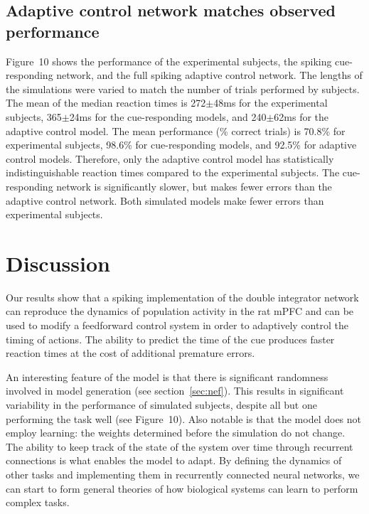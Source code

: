 \documentclass[11pt]{article}
\begin{document}
\subsection{Adaptive control network matches observed performance}

Figure~10 shows the performance
of the experimental subjects,
the spiking cue-responding network,
and the full spiking adaptive control network.
The lengths of the simulations were
varied to match the number of trials
performed by subjects.
The mean of the median reaction times
is 272$\pm$48ms for the experimental subjects,
365$\pm$24ms for the cue-responding models,
and 240$\pm$62ms for the adaptive control model.
The mean performance (\% correct trials) is
70.8\% for experimental subjects,
98.6\% for cue-responding models,
and 92.5\% for adaptive control models.
Therefore, only the adaptive control model
has statistically indistinguishable reaction times
compared to the experimental subjects.
The cue-responding network is significantly slower,
but makes fewer errors than the adaptive control network.
Both simulated models make fewer errors
than experimental subjects.

\section{Discussion}

Our results show that a spiking implementation
of the double integrator network
\cite{Singh2006} can reproduce the dynamics
of population activity in the rat mPFC
\cite{Narayanan2009} and can be
used to modify a feedforward control system
in order to adaptively control
the timing of actions.
The ability to predict the time of the cue
produces faster reaction times at the cost
of additional premature errors.

An interesting feature of the model
is that there is significant randomness
involved in model generation (see section~\ref{sec:nef}).
This results in significant variability
in the performance of simulated subjects,
despite all but one performing the task well
(see Figure~10).
Also notable is that the model
does not employ learning:
the weights determined
before the simulation do not change.
The ability to keep track of the state
of the system over time through recurrent connections
is what enables the model to adapt.
By defining the dynamics of other tasks
and implementing them
in recurrently connected neural networks,
we can start to form general theories
of how biological systems can learn
to perform complex tasks.
\end{document}
